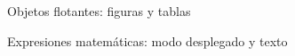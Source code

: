 \begin{frame}[fragile]
	\begin{block}{Objetos flotantes: figuras y tablas}\end{block} %
	\begin{block}{Expresiones matemáticas: modo desplegado y texto}\end{block} %
\end{frame}
